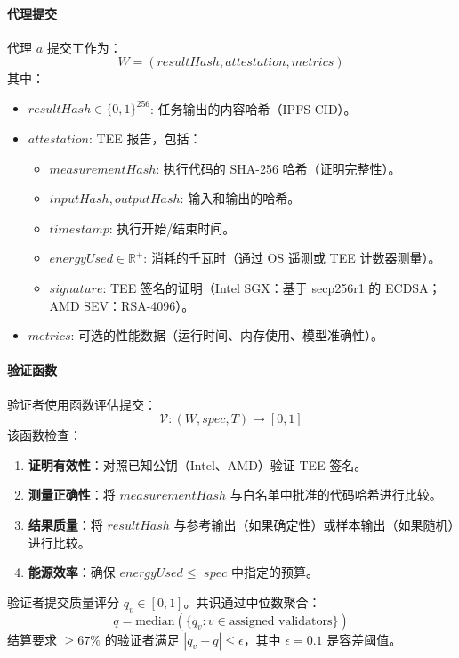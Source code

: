 \documentclass[11pt]{article}
\begin{document}
\paragraph{代理提交} 代理 $a$ 提交工作为：
\begin{equation}
W = (resultHash, attestation, metrics)
\end{equation}
其中：
\begin{itemize}[noitemsep]
  \item $resultHash \in \{0,1\}^{256}$: 任务输出的内容哈希（IPFS CID）。
  \item $attestation$: TEE 报告，包括：
    \begin{itemize}[noitemsep]
      \item $measurementHash$: 执行代码的 SHA-256 哈希（证明完整性）。
      \item $inputHash, outputHash$: 输入和输出的哈希。
      \item $timestamp$: 执行开始/结束时间。
      \item $energyUsed \in \mathbb{R}^+$: 消耗的千瓦时（通过 OS 遥测或 TEE 计数器测量）。
      \item $signature$: TEE 签名的证明（Intel SGX：基于 secp256r1 的 ECDSA；AMD SEV：RSA-4096）。
    \end{itemize}
  \item $metrics$: 可选的性能数据（运行时间、内存使用、模型准确性）。
\end{itemize}

\paragraph{验证函数} 验证者使用函数评估提交：
\begin{equation}
\mathcal{V}: (W, spec, T) \rightarrow [0, 1]
\end{equation}
该函数检查：
\begin{enumerate}[noitemsep]
  \item \textbf{证明有效性}：对照已知公钥（Intel、AMD）验证 TEE 签名。
  \item \textbf{测量正确性}：将 $measurementHash$ 与白名单中批准的代码哈希进行比较。
  \item \textbf{结果质量}：将 $resultHash$ 与参考输出（如果确定性）或样本输出（如果随机）进行比较。
  \item \textbf{能源效率}：确保 $energyUsed \leq$ $spec$ 中指定的预算。
\end{enumerate}
验证者提交质量评分 $q_v \in [0,1]$。共识通过中位数聚合：
\begin{equation}
q = \text{median}(\{q_v : v \in \text{assigned validators}\})
\end{equation}
结算要求 $\geq 67\%$ 的验证者满足 $|q_v - q| \leq \epsilon$，其中 $\epsilon = 0.1$ 是容差阈值。
\end{document}
